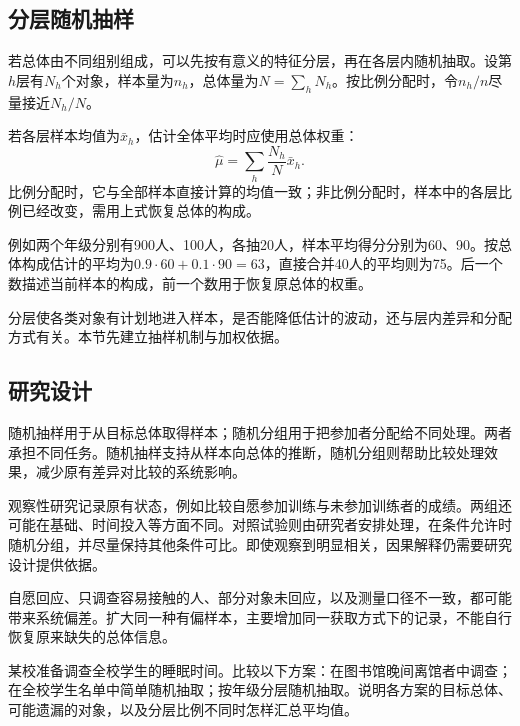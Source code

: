 \subsection{分层随机抽样}

若总体由不同组别组成，可以先按有意义的特征分层，再在各层内随机抽取。设第\(h\)层有\(N_h\)个对象，样本量为\(n_h\)，总体量为\(N=\sum_hN_h\)。按比例分配时，令\(n_h/n\)尽量接近\(N_h/N\)。

若各层样本均值为\(\bar x_h\)，估计全体平均时应使用总体权重：
\begin{equation}\label{eq:prob-stratified-estimate}
 \widehat\mu=\sum_h\frac{N_h}{N}\bar x_h.
\end{equation}
比例分配时，它与全部样本直接计算的均值一致；非比例分配时，样本中的各层比例已经改变，需用上式恢复总体的构成。

例如两个年级分别有900人、100人，各抽20人，样本平均得分分别为60、90。按总体构成估计的平均为\(0.9\cdot60+0.1\cdot90=63\)，直接合并40人的平均则为75。后一个数描述当前样本的构成，前一个数用于恢复原总体的权重。

分层使各类对象有计划地进入样本，是否能降低估计的波动，还与层内差异和分配方式有关。本节先建立抽样机制与加权依据。

\subsection{研究设计}

随机抽样用于从目标总体取得样本；随机分组用于把参加者分配给不同处理。两者承担不同任务。随机抽样支持从样本向总体的推断，随机分组则帮助比较处理效果，减少原有差异对比较的系统影响。

观察性研究记录原有状态，例如比较自愿参加训练与未参加训练者的成绩。两组还可能在基础、时间投入等方面不同。对照试验则由研究者安排处理，在条件允许时随机分组，并尽量保持其他条件可比。即使观察到明显相关，因果解释仍需要研究设计提供依据。

自愿回应、只调查容易接触的人、部分对象未回应，以及测量口径不一致，都可能带来系统偏差。扩大同一种有偏样本，主要增加同一获取方式下的记录，不能自行恢复原来缺失的总体信息。

\begin{example}
某校准备调查全校学生的睡眠时间。比较以下方案：在图书馆晚间离馆者中调查；在全校学生名单中简单随机抽取；按年级分层随机抽取。说明各方案的目标总体、可能遗漏的对象，以及分层比例不同时怎样汇总平均值。
\end{example}

